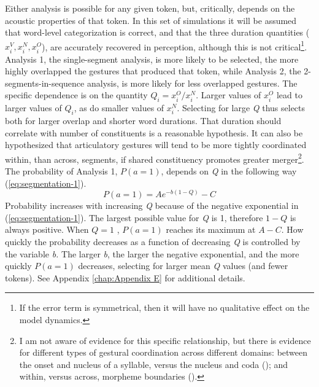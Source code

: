 Either analysis is possible for any given token, but, critically,
depends on the acoustic properties of that token. In this set of simulations
it will be assumed that word-level categorization is correct, and
that the three duration quantities ($x_{i}^{V},x_{i}^{N},x_{i}^{O}$),
are accurately recovered in perception, although this is not critical\footnote{If the error term is symmetrical, then it will have no qualitative
effect on the model dynamics.}. Analysis 1, the single-segment analysis, is more likely to be selected,
the more highly overlapped the gestures that produced that token,
while Analysis 2, the 2-segments-in-sequence analysis, is more likely
for less overlapped gestures. The specific dependence is on the quantity
$Q_{i}={x_{i}^{O}}/{x_{i}^{N}}$. Larger values of $x_{i}^{O}$
lead to larger values of $Q_{i}$, as do smaller values of $x_{i}^{N}$.
Selecting for large \emph{Q} thus selects both for larger overlap
and shorter word durations. That duration should correlate with number
of constituents is a reasonable hypothesis. It can also be hypothesized
that articulatory gestures will tend to be more tightly coordinated
within, than across, segments, if shared constituency promotes greater
merger\footnote{I am not aware of evidence for this specific relationship, but there
is evidence for different types of gestural coordination across different
domains: between the onset and nucleus of a syllable, versus the nucleus
and coda (\citealt{Browman1988,byrd1996influences}); and within,
versus across, morpheme boundaries (\citealt{Cho2001}).}. The probability of Analysis 1, $P(a=1)$, depends on \emph{Q} in
the following way (\ref{eq:segmentation-1}).
\begin{equation}
P(a=1)=Ae^{-b(1-Q)}-C\label{eq:segmentation-1}
\end{equation}
Probability increases with increasing \emph{Q} because of the negative
exponential in (\ref{eq:segmentation-1}). The largest possible value
for \emph{Q} is 1, therefore $1-Q$ is always positive. When $Q=1$
, $P(a=1)$ reaches its maximum at $A-C$. How quickly the probability
decreases as a function of decreasing \emph{Q} is controlled by the
variable \emph{b. }The larger \emph{b}, the larger the negative exponential,
and the more quickly $P(a=1)$ decreases, selecting for larger mean
\emph{Q} values (and fewer tokens). See Appendix \ref{chap:Appendix E}
for additional details.

